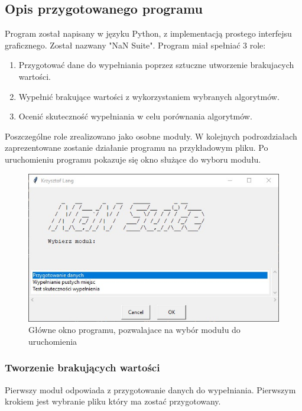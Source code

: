 \documentclass[12pt,twoside]{article}
\begin{document}
\subsection{Opis przygotowanego programu}
Program został napisany w języku Python, z implementacją prostego interfejsu graficznego. Został nazwany "NaN Suite".
Program miał spełniać 3 role:
\begin{enumerate}[label=\arabic*), leftmargin=1.25cm]
    \item Przygotować dane do wypełniania poprzez sztuczne utworzenie brakujacych wartości.
    \item Wypełnić brakujące wartości z wykorzystaniem wybranych algorytmów.
    \item Ocenić skuteczność wypełniania w celu porównania algorytmów.
\end{enumerate}
Poszczególne role zrealizowano jako osobne moduły. W kolejnych podrozdziałach zaprezentowane zostanie działanie programu na przykładowym pliku.
Po uruchomieniu programu pokazuje się okno służące do wyboru modułu.

\begin{figure}[ht]
	\centering
	\includegraphics[width=12cm]{img/01.jpg}
	\caption{Główne okno programu, pozwalajace na wybór modułu do uruchomienia}
\label{Fig:main}
\end{figure}

\subsubsection{Tworzenie brakujących wartości}
Pierwszy moduł odpowiada z przygotowanie danych do wypełniania. Pierwszym krokiem jest wybranie pliku który ma zostać przygotowany.
\end{document}

